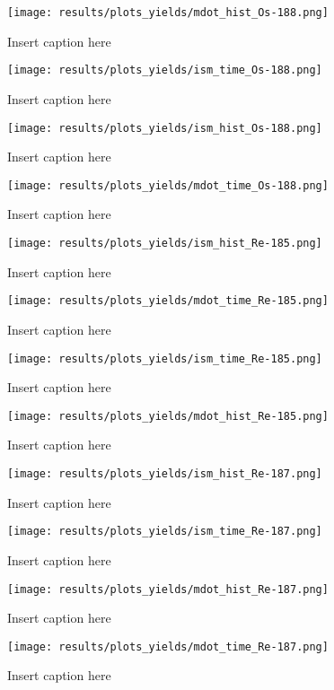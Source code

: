 \begin{figure}
  \centering
  \texttt{[image: results/plots\_yields/mdot\_hist\_Os-188.png]}
  \caption{Insert caption here}
\end{figure}
\begin{figure}
  \centering
  \texttt{[image: results/plots\_yields/ism\_time\_Os-188.png]}
  \caption{Insert caption here}
\end{figure}
\begin{figure}
  \centering
  \texttt{[image: results/plots\_yields/ism\_hist\_Os-188.png]}
  \caption{Insert caption here}
\end{figure}
\begin{figure}
  \centering
  \texttt{[image: results/plots\_yields/mdot\_time\_Os-188.png]}
  \caption{Insert caption here}
\end{figure}

\begin{figure}
  \centering
  \texttt{[image: results/plots\_yields/ism\_hist\_Re-185.png]}
  \caption{Insert caption here}
\end{figure}
\begin{figure}
  \centering
  \texttt{[image: results/plots\_yields/mdot\_time\_Re-185.png]}
  \caption{Insert caption here}
\end{figure}
\begin{figure}
  \centering
  \texttt{[image: results/plots\_yields/ism\_time\_Re-185.png]}
  \caption{Insert caption here}
\end{figure}
\begin{figure}
  \centering
  \texttt{[image: results/plots\_yields/mdot\_hist\_Re-185.png]}
  \caption{Insert caption here}
\end{figure}

\begin{figure}
  \centering
  \texttt{[image: results/plots\_yields/ism\_hist\_Re-187.png]}
  \caption{Insert caption here}
\end{figure}
\begin{figure}
  \centering
  \texttt{[image: results/plots\_yields/ism\_time\_Re-187.png]}
  \caption{Insert caption here}
\end{figure}
\begin{figure}
  \centering
  \texttt{[image: results/plots\_yields/mdot\_hist\_Re-187.png]}
  \caption{Insert caption here}
\end{figure}
\begin{figure}
  \centering
  \texttt{[image: results/plots\_yields/mdot\_time\_Re-187.png]}
  \caption{Insert caption here}
\end{figure}


